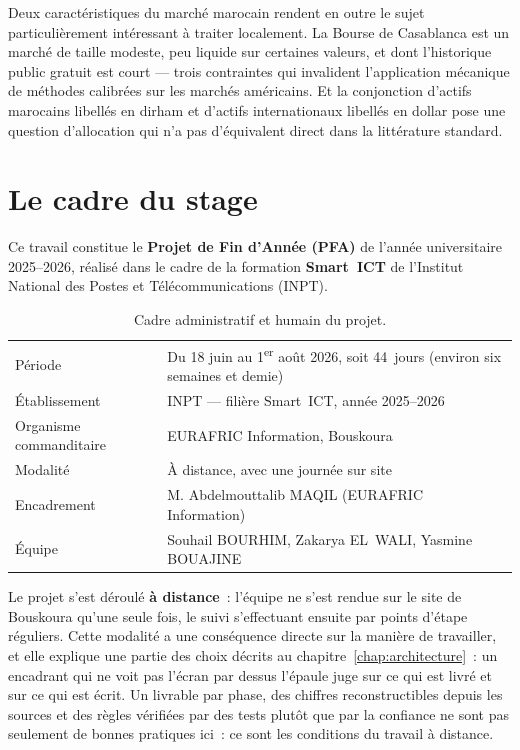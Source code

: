 Deux caractéristiques du marché marocain rendent en outre le sujet
particulièrement intéressant à traiter localement. La Bourse de Casablanca est un
marché de taille modeste, peu liquide sur certaines valeurs, et dont
l'historique public gratuit est court — trois contraintes qui invalident
l'application mécanique de méthodes calibrées sur les marchés américains. Et la
conjonction d'actifs marocains libellés en dirham et d'actifs internationaux
libellés en dollar pose une question d'allocation qui n'a pas d'équivalent
direct dans la littérature standard.

\section{Le cadre du stage}

Ce travail constitue le \textbf{Projet de Fin d'Année (PFA)} de l'année
universitaire 2025--2026, réalisé dans le cadre de la formation
\textbf{Smart~ICT} de l'Institut National des Postes et Télécommunications
(INPT).

\begin{table}[htbp]
  \centering
  \small
  \caption[Cadre du stage]{Cadre administratif et humain du projet.}
  \label{tab:cadre}
  \begin{tabular}{@{}p{3.6cm}p{9.4cm}@{}}
    \toprule
    Période & Du 18 juin au 1\textsuperscript{er} août 2026, soit 44~jours
    (environ six semaines et demie) \\
    Établissement & INPT — filière Smart~ICT, année 2025--2026 \\
    Organisme commanditaire & EURAFRIC Information, Bouskoura \\
    Modalité & À distance, avec une journée sur site \\
    Encadrement & M. Abdelmouttalib MAQIL (EURAFRIC Information) \\
    Équipe & Souhail BOURHIM, Zakarya EL~WALI, Yasmine BOUAJINE \\
    \bottomrule
  \end{tabular}
\end{table}

Le projet s'est déroulé \textbf{à distance}~: l'équipe ne s'est rendue sur le
site de Bouskoura qu'une seule fois, le suivi s'effectuant ensuite par points
d'étape réguliers. Cette modalité a une conséquence directe sur la manière de
travailler, et elle explique une partie des choix décrits au
chapitre~\ref{chap:architecture}~: un encadrant qui ne voit pas l'écran par
dessus l'épaule juge sur ce qui est livré et sur ce qui est écrit. Un livrable
par phase, des chiffres reconstructibles depuis les sources et des règles
vérifiées par des tests plutôt que par la confiance ne sont pas seulement de
bonnes pratiques ici~: ce sont les conditions du travail à distance.

